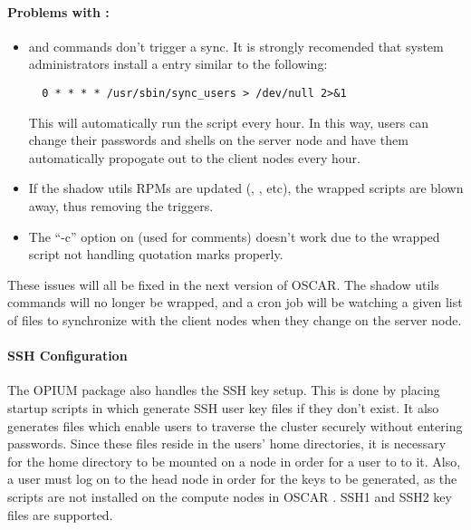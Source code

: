 \paragraph{Problems with :}
\begin{itemize}
\item {} and  commands don't trigger a sync.  It
  is strongly recomended that system administrators install a
    entry similar to the following:

\begin{verbatim}
  0 * * * * /usr/sbin/sync_users > /dev/null 2>&1
\end{verbatim}

  This will automatically run the  script every
  hour.  In this way, users can change their passwords and shells on
  the server node and have them automatically propogate out to the
  client nodes every hour.
  
\item If the shadow utils RPMs are updated (,
  , etc), the wrapped scripts are blown away, thus
  removing the  triggers.
  
\item The ``-c'' option on  (used for comments) doesn't
  work due to the wrapped script not handling quotation marks
  properly.
\end{itemize}

These issues will all be fixed in the next version of OSCAR.  The
shadow utils commands will no longer be wrapped, and a cron job will
be watching a given list of files to synchronize with the client nodes
when they change on the server node.

\paragraph{SSH Configuration}

The OPIUM package also handles the SSH key setup.  This is done by
placing startup scripts in  which generate SSH
user key files if they don't exist.  It also generates
 files which enable users to traverse the
cluster securely without entering passwords.  Since these files reside
in the users' home directories, it is necessary for the home directory
to be mounted on a node in order for a user to  to it.  Also,
a user must log on to the head node in order for the keys to be
generated, as the  scripts are not installed on
the compute nodes in OSCAR \oscarversion.  SSH1 and SSH2 key files are
supported.

